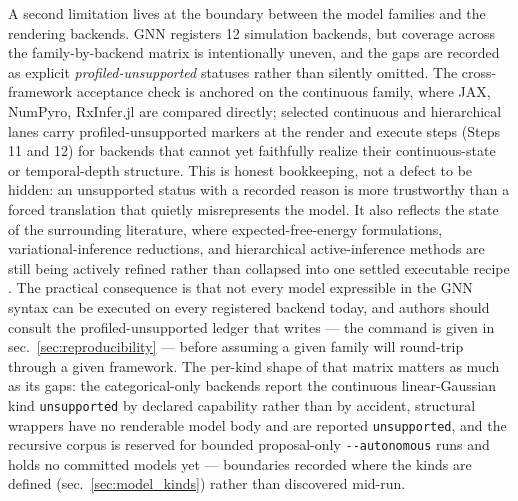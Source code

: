 \documentclass[
  english,
  9pt,
]{extarticle}
\begin{document}
A second limitation lives at the boundary between the model families and
the rendering backends. GNN registers 12 simulation backends, but
coverage across the family-by-backend matrix is intentionally uneven,
and the gaps are recorded as explicit \emph{profiled-unsupported}
statuses rather than silently omitted. The cross-framework acceptance
check is anchored on the continuous family, where JAX, NumPyro,
RxInfer.jl are compared directly; selected continuous and hierarchical
lanes carry profiled-unsupported markers at the render and execute steps
(Steps 11 and 12) for backends that cannot yet faithfully realize their
continuous-state or temporal-depth structure. This is honest
bookkeeping, not a defect to be hidden: an unsupported status with a
recorded reason is more trustworthy than a forced translation that
quietly misrepresents the model. It also reflects the state of the
surrounding literature, where expected-free-energy formulations,
variational-inference reductions, and hierarchical active-inference
methods are still being actively refined rather than collapsed into one
settled executable recipe
\citep{champion2024reframingEfe, nuijten2026typeInference, rangarajan2026hierarchicalSuccessor}.
The practical consequence is that not every model expressible in the GNN
syntax can be executed on every registered backend today, and authors
should consult the profiled-unsupported ledger that
 writes --- the
command is given in sec.~\ref{sec:reproducibility} --- before assuming a
given family will round-trip through a given framework. The per-kind
shape of that matrix matters as much as its gaps: the categorical-only
backends report the continuous linear-Gaussian kind \texttt{unsupported}
by declared capability rather than by accident, structural wrappers have
no renderable model body and are reported \texttt{unsupported}, and the
recursive corpus is reserved for bounded proposal-only
\texttt{-\/-autonomous} runs and holds no committed models yet ---
boundaries recorded where the kinds are defined
(sec.~\ref{sec:model_kinds}) rather than discovered mid-run.
\end{document}
